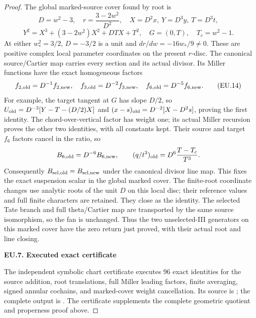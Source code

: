 \begin{proof}
The global marked-source cover found by root is
\[
 D=w^2-3,\quad r=\frac{3-2w^2}{D^2},\quad
 X=D^2x,\ Y=D^3y,\ T=D^3t,
\]
\[
 Y^2=X^3+(3-2w^2)X^2+DTX+T^2,\quad
 G=(0,T),\quad T_c=w^2-1.
 \tag{EU.13}
\]
At either \(w_*^2=3/2\), \(D=-3/2\) is a unit and
\(dr/dw=-16w_*/9\ne0\). These are positive complex local
parameter coordinates on the present \(r\)-disc. The canonical
source/Cartier map carries every section and its actual divisor.
Its Miller functions have the exact homogeneous factors
\[
 f_{2,\rm old}=D^{-1}f_{2,\rm new},\quad
 f_{3,\rm old}=D^{-2}f_{3,\rm new},\quad
 f_{6,\rm old}=D^{-5}f_{6,\rm new}.
 \tag{EU.14}
\]
For example, the target tangent at \(G\) has slope \(D/2\), so
\(U_{\rm old}=D^{-3}[Y-T-(D/2)X]\) and
\((x-s)_{\rm old}=D^{-2}[X-D^2s]\), proving the first identity.
The chord-over-vertical factor has weight one; its actual Miller
recursion proves the other two identities, with all constants kept.
Their source and target \(f_6\) factors cancel in the ratio, so
\[
 B_{6,\rm old}=D^{-6}B_{6,\rm new},\qquad
 (q/t^3)_{\rm old}=D^6\frac{T-T_c}{T^3}.
\]
Consequently \(B_{\rm sel,old}=B_{\rm sel,new}\) under the
canonical divisor line map. This fixes the exact suspension scalar
in the global marked cover. The finite-root coordinate changes use
analytic roots of the unit \(D\) on this local disc; their reference
values and full finite characters are retained. They close as the
identity. The selected Tate branch and full theta/Cartier map are
transported by the same source isomorphism, so the fan is unchanged.
Thus the two unselected-III generators on this marked cover have
the zero return just proved, with their actual root and line closing.

\par

\medskip\noindent\textbf{EU.7. Executed exact certificate}

\par\nobreak

The independent symbolic chart certificate executes 96 exact identities for the source addition, root translations, full Miller leading factors, finite averaging, signed annular cochains, and marked-cover weight cancellation. Its source is ; the complete output is . The certificate supplements the complete geometric quotient and properness proof above.

\end{proof}
